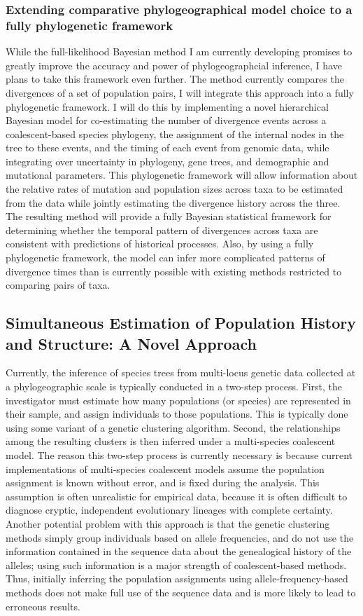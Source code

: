 \subsubsection*{Extending comparative phylogeographical model choice to a fully
    phylogenetic framework}
While the full-likelihood Bayesian method I am currently developing promises to
greatly improve the accuracy and power of phylogeographcial inference, I have
plans to take this framework even further.
The method currently compares the divergences of a set of population pairs, I
will integrate this approach into a fully phylogenetic framework.
I will do this by implementing a novel hierarchical Bayesian model for
co-estimating the number of divergence events across a coalescent-based species
phylogeny, the assignment of the internal nodes in the tree to these events,
and the timing of each event from genomic data, while integrating over
uncertainty in phylogeny, gene trees, and demographic and mutational
parameters.
This phylogenetic framework will allow information about the relative rates of
mutation and population sizes across taxa to be estimated from the data while
jointly estimating the divergence history across the three.
The resulting method will provide a fully Bayesian statistical framework
for determining whether the temporal pattern of divergences across taxa are
consistent with predictions of historical processes.
Also, by using a fully phylogenetic framework, the model can infer more
complicated patterns of divergence times than is currently possible with
existing methods restricted to comparing pairs of taxa.

\subsection*{Simultaneous Estimation of Population History and Structure: A
Novel Approach}
Currently, the inference of species trees from multi-locus genetic data
collected at a phylogeographic scale is typically conducted in a two-step
process.
First, the investigator must estimate how many populations (or species) are
represented in their sample, and assign individuals to those populations.
This is typically done using some variant of a genetic clustering algorithm.
Second, the relationships among the resulting clusters is then inferred under a
multi-species coalescent model.
The reason this two-step process is currently necessary is because current
implementations of multi-species coalescent models assume the population
assignment is known without error, and is fixed during the analysis.
This assumption is often unrealistic for empirical data, because it is often
difficult to diagnose cryptic, independent evolutionary lineages with complete
certainty.
Another potential problem with this approach is that the genetic clustering
methods simply group individuals based on allele frequencies, and do not use
the information contained in the sequence data about the genealogical history
of the alleles; using such information is a major strength of coalescent-based
methods.
Thus, initially inferring the population assignments using
allele-frequency-based methods does not make full use of the sequence data and
is more likely to lead to erroneous results.

